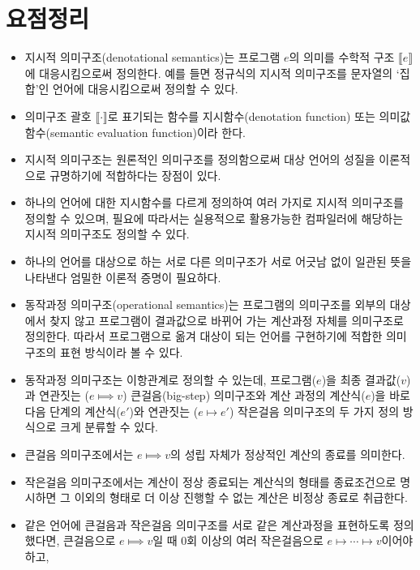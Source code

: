 \section*{요점정리}
\begin{itemize}[itemsep=0pt]
 \item 지시적 의미구조(denotational semantics)는 프로그램 $e$의 의미를
       수학적 구조 $\llbracket e\rrbracket$에 대응시킴으로써 정의한다.
       예를 들면 정규식의 지시적 의미구조를 문자열의 `집합'인 언어에
       대응시킴으로써 정의할 수 있다.
 \item 의미구조 괄호 $\llbracket \cdot \rrbracket$로 표기되는
       함수를 지시함수(denotation function) 또는
       의미값함수(semantic evaluation function)이라 한다.
 \item 지시적 의미구조는 원론적인 의미구조를 정의함으로써 대상 언어의
       성질을 이론적으로 규명하기에 적합하다는 장점이 있다.
 \item 하나의 언어에 대한 지시함수를 다르게 정의하여 여러 가지로
       지시적 의미구조를 정의할 수 있으며, 필요에 따라서는 실용적으로
       활용가능한 컴파일러에 해당하는 지시적 의미구조도 정의할 수 있다.
 \item 하나의 언어를 대상으로 하는 서로 다른 의미구조가 서로 어긋남
       없이 일관된 뜻을 나타낸다 엄밀한 이론적 증명이 필요하다.
 \item 동작과정 의미구조(operational semantics)는 프로그램의 의미구조를
       외부의 대상에서 찾지 않고 프로그램이 결과값으로 바뀌어 가는
       계산과정 자체를 의미구조로 정의한다. 따라서 프로그램으로 옮겨
       대상이 되는 언어를 구현하기에 적합한 의미구조의 표현 방식이라 볼 수 있다.
 \item 동작과정 의미구조는 이항관계로 정의할 수 있는데,
       프로그램($e$)을 최종 결과값($v$)과 연관짓는 ($e\Longmapsto v$)
       큰걸음(big-step) 의미구조와 계산 과정의 계산식($e$)을 바로
       다음 단계의 계산식($e'$)와 연관짓는 ($e\longmapsto e'$)
       작은걸음 의미구조의 두 가지 정의 방식으로 크게 분류할 수 있다.
 \item 큰걸음 의미구조에서는 $e\Longmapsto v$의 성립 자체가 정상적인
       계산의 종료를 의미한다.
 \item 작은걸음 의미구조에서는 계산이 정상 종료되는 계산식의 형태를
       종료조건으로 명시하면 그 이외의 형태로 더 이상 진행할 수 없는
       계산은 비정상 종료로 취급한다.
 \item 같은 언어에 큰걸음과 작은걸음 의미구조를 서로 같은 계산과정을
       표현하도록 정의했다면, 큰걸음으로 $e\Longmapsto v$일 때
       0회 이상의 여러 작은걸음으로 $e\longmapsto \cdots \longmapsto v$이어야 하고,

\end{itemize}
